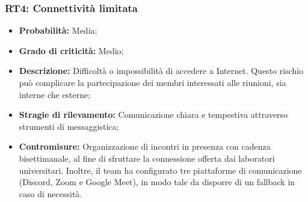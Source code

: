 \subsubsection{RT4: Connettività limitata}
\begin{itemize}
    \item \textbf{Probabilità:} Media;
    \item \textbf{Grado di criticità:} Medio;
    \item \textbf{Descrizione:} Difficoltà o impossibilità di accedere a Internet. Questo rischio può complicare la partecipazione dei membri interessati alle riunioni, sia interne che esterne;
    \item \textbf{Stragie di rilevamento:} Comunicazione chiara e tempestiva attraverso strumenti di messaggistica;
    \item \textbf{Contromisure:} Organizzazione di incontri in presenza con cadenza bisettimanale, al fine di sfruttare la connessione offerta dai laboratori universitari. Inoltre, il team ha configurato tre piattaforme di comunicazione (Discord, Zoom e Google Meet), in modo tale da disporre di un fallback in caso di necessità.
\end{itemize}
